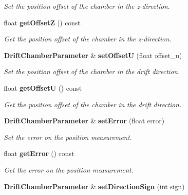 \begin{DoxyCompactItemize}
\begin{DoxyCompactList}\small\item\em Set the position offset of the chamber in the z-\/direction. \end{DoxyCompactList}\item 
float {\bf get\-Offset\-Z} () const \label{classCALICE_1_1DriftChamberParameter_a1925ac170371b9574a3b4998c4b4f1f0}

\begin{DoxyCompactList}\small\item\em Get the position offset of the chamber in the z-\/direction. \end{DoxyCompactList}\item 
{\bf Drift\-Chamber\-Parameter} \& {\bf set\-Offset\-U} (float offset\-\_\-u)\label{classCALICE_1_1DriftChamberParameter_a7f9a1ae51dfad2028a0b5993433c98cb}

\begin{DoxyCompactList}\small\item\em Set the position offset of the chamber in the drift direction. \end{DoxyCompactList}\item 
float {\bf get\-Offset\-U} () const \label{classCALICE_1_1DriftChamberParameter_a2dd08e38dd7db22ee48b0272c1903b39}

\begin{DoxyCompactList}\small\item\em Get the position offset of the chamber in the drift direction. \end{DoxyCompactList}\item 
{\bf Drift\-Chamber\-Parameter} \& {\bf set\-Error} (float error)\label{classCALICE_1_1DriftChamberParameter_a0512b63c9b0bee95b8e69d10c27ded14}

\begin{DoxyCompactList}\small\item\em Set the error on the position measurement. \end{DoxyCompactList}\item 
float {\bf get\-Error} () const \label{classCALICE_1_1DriftChamberParameter_a8e971cf949cfad6d401fa191619da841}

\begin{DoxyCompactList}\small\item\em Get the error on the position measurement. \end{DoxyCompactList}\item 
{\bf Drift\-Chamber\-Parameter} \& {\bf set\-Direction\-Sign} (int sign)\label{classCALICE_1_1DriftChamberParameter_afd5956ba2128c0f666c64122f15d9d4b}


\end{DoxyCompactItemize}
